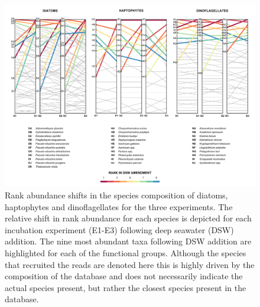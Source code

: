 
\begin{landscape}
   \vfill        %
\begin{figure}[p!]
  \centering
    \includegraphics[width=1\textwidth]{Images/C4_FigureS2.pdf}
    \caption[Rank abundance shifts in the species composition of diatoms, haptophytes and dinoflagellates]{Rank abundance shifts in the species composition of diatoms, haptophytes and dinoflagellates for the three experiments. The relative shift in rank abundance for each species is depicted for each incubation experiment (E1-E3) following deep seawater (DSW) addition. The nine most abundant taxa following DSW addition are highlighted for each of the functional groups. Although the species that recruited the reads are denoted here this is highly driven by the composition of the database and does not necessarily indicate the actual species present, but rather the closest species present in the database.}
  \label{fig:a4f2}
\end{figure}
    \vfill        %
\end{landscape}




